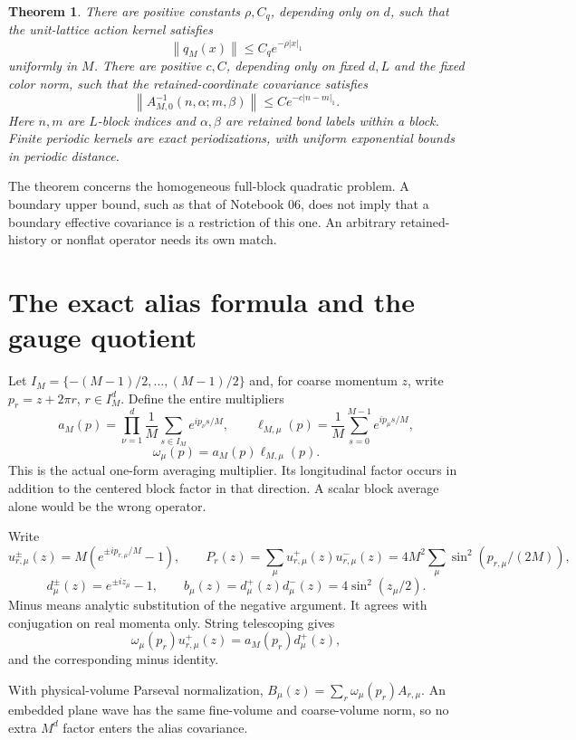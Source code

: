 \documentclass[11pt]{article}
\newtheorem{theorem}{Theorem}[section]
\theoremstyle{remark}
\newcommand{\norm}[1]{\left\|#1\right\|}
\begin{document}
\begin{theorem}\label{thm:flat-decay}
There are positive constants $\rho,C_q$, depending only on $d$, such that
the unit-lattice action kernel satisfies
\[
 \norm{q_M(x)}\le C_qe^{-\rho|x|_1}
\]
uniformly in $M$. There are positive $c,C$, depending only on fixed
$d,L$ and the fixed color norm, such that the retained-coordinate
covariance satisfies
\[
 \norm{A_{M,0}^{-1}(n,\alpha;m,\beta)}
 \le Ce^{-c|n-m|_1}.
\]
Here $n,m$ are $L$-block indices and $\alpha,\beta$ are retained
bond labels within a block. Finite periodic kernels are exact
periodizations, with uniform exponential bounds in periodic distance.
\end{theorem}

The theorem concerns the homogeneous full-block quadratic problem.
A boundary upper bound, such as that of Notebook 06, does not imply
that a boundary effective covariance is a restriction of this one.
An arbitrary retained-history or nonflat operator needs its own match.

\section{The exact alias formula and the gauge quotient}

Let $I_M=\{-(M-1)/2,\ldots,(M-1)/2\}$ and, for coarse momentum
$z$, write $p_r=z+2\pi r$, $r\in I_M^d$. Define the entire multipliers
\[
 a_M(p)=\prod_{\nu=1}^d\frac1M\sum_{s\in I_M}e^{ip_\nu s/M},
 \qquad
 \ell_{M,\mu}(p)=\frac1M\sum_{s=0}^{M-1}e^{ip_\mu s/M},
\]
\[
 \omega_\mu(p)=a_M(p)\ell_{M,\mu}(p).
\]
This is the actual one-form averaging multiplier. Its longitudinal
factor occurs in addition to the centered block factor in that
direction. A scalar block average alone would be the wrong operator.

Write
\[
 u_{r,\mu}^{\pm}(z)=M(e^{\pm ip_{r,\mu}/M}-1),\qquad
 P_r(z)=\sum_\mu u_{r,\mu}^+(z)u_{r,\mu}^-(z)
       =4M^2\sum_\mu\sin^2(p_{r,\mu}/(2M)),
\]
\[
 d_\mu^\pm(z)=e^{\pm iz_\mu}-1,\qquad
 b_\mu(z)=d_\mu^+(z)d_\mu^-(z)=4\sin^2(z_\mu/2).
\]
Minus means analytic substitution of the negative argument. It agrees
with conjugation on real momenta only. String telescoping gives
\begin{equation}\label{eq:gradient-symbol}
 \omega_\mu(p_r)u_{r,\mu}^+(z)=a_M(p_r)d_\mu^+(z),
\end{equation}
and the corresponding minus identity.

With physical-volume Parseval normalization,
$B_\mu(z)=\sum_r\omega_\mu(p_r)A_{r,\mu}$.
An embedded plane wave has the same fine-volume and coarse-volume
norm, so no extra $M^d$ factor enters the alias covariance.
\end{document}
